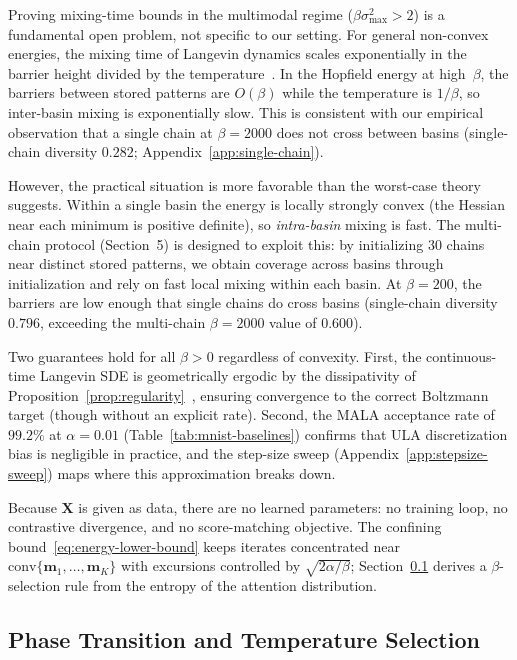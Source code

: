 Proving mixing-time bounds in the multimodal regime ($\beta\sigma_{\max}^{2}>2$) is a fundamental open problem, not specific to our setting. For general non-convex energies, the mixing time of Langevin dynamics scales exponentially in the barrier height divided by the temperature~\cite{bovier2004metastability}. In the Hopfield energy at high~$\beta$, the barriers between stored patterns are $O(\beta)$ while the temperature is $1/\beta$, so inter-basin mixing is exponentially slow. This is consistent with our empirical observation that a single chain at $\beta{=}2000$ does not cross between basins (single-chain diversity $0.282$; Appendix~\ref{app:single-chain}).

However, the practical situation is more favorable than the worst-case theory suggests. Within a single basin the energy is locally strongly convex (the Hessian near each minimum is positive definite), so \emph{intra-basin} mixing is fast. The multi-chain protocol (Section~5) is designed to exploit this: by initializing 30 chains near distinct stored patterns, we obtain coverage across basins through initialization and rely on fast local mixing within each basin. At $\beta{=}200$, the barriers are low enough that single chains do cross basins (single-chain diversity $0.796$, exceeding the multi-chain $\beta{=}2000$ value of $0.600$).

Two guarantees hold for all $\beta>0$ regardless of convexity. First, the continuous-time Langevin SDE is geometrically ergodic by the dissipativity of Proposition~\ref{prop:regularity}~\cite{robertsTweedieExponentialConvergence1996}, ensuring convergence to the correct Boltzmann target (though without an explicit rate). Second, the MALA acceptance rate of $99.2\%$ at $\alpha{=}0.01$ (Table~\ref{tab:mnist-baselines}) confirms that ULA discretization bias is negligible in practice, and the step-size sweep (Appendix~\ref{app:stepsize-sweep}) maps where this approximation breaks down.

Because $\mathbf{X}$ is given as data, there are no learned parameters: no training loop, no contrastive divergence, and no score-matching objective. The confining bound~\eqref{eq:energy-lower-bound} keeps iterates concentrated near $\mathrm{conv}\{\mathbf{m}_1,\dots,\mathbf{m}_K\}$ with excursions controlled by $\sqrt{2\alpha/\beta}$; Section~\ref{sec:phase-transition} derives a $\beta$-selection rule from the entropy of the attention distribution.

\subsection{Phase Transition and Temperature Selection}\label{sec:phase-transition}

